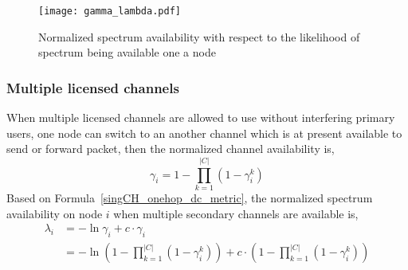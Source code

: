 \begin{figure}
\centering
\texttt{[image: gamma\_lambda.pdf]}
\caption{Normalized spectrum availability with respect to the likelihood of spectrum being available one a node}
\label{fig:gamma_lambda}
\end{figure}





\subsubsection*{Multiple licensed channels}
When multiple licensed channels are allowed to use without interfering primary users, one node can switch to an another channel which is at present available to send or forward packet, then the normalized channel availability is,
\begin{equation}
\gamma_i = 1-\prod_{k=1}^{|C|} (1-\gamma_i^k)
\label{gamma_multichannel}
\end{equation} 
Based on Formula~\ref{singCH_onehop_dc_metric}, the normalized spectrum availability on node $i$ when multiple secondary channels are available is,
\begin{equation}
\label{mulCH_onehop_dc_metric}
\begin{aligned}
\lambda_i & = -\ln \gamma_i+ c \cdot \gamma_i\\
		&= -\ln(1-\prod_{k=1}^{|C|}(1-\gamma_i^k)) + c \cdot (1-\prod_{k=1}^{|C|}(1-\gamma_i^k))
\end{aligned}
\end{equation}


